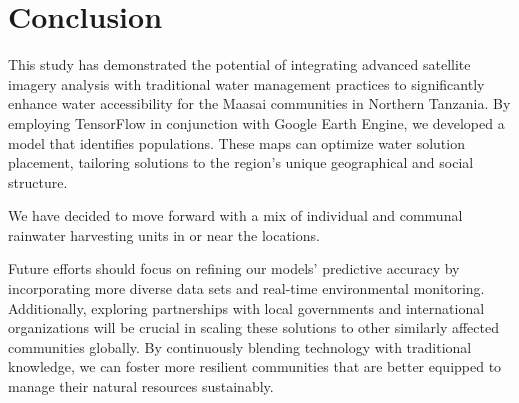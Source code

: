 \documentclass{article}
\begin{document}

\section{Conclusion}

This study has demonstrated the potential of integrating advanced satellite imagery analysis with traditional water management practices to significantly enhance water accessibility for the Maasai communities in Northern Tanzania. By employing TensorFlow in conjunction with Google Earth Engine, we developed a model that identifies populations. These maps can optimize water solution placement, tailoring solutions to the region's unique geographical and social structure.

We have decided to move forward with a mix of individual and communal rainwater harvesting units in or near the locations.

Future efforts should focus on refining our models' predictive accuracy by incorporating more diverse data sets and real-time environmental monitoring. Additionally, exploring partnerships with local governments and international organizations will be crucial in scaling these solutions to other similarly affected communities globally. By continuously blending technology with traditional knowledge, we can foster more resilient communities that are better equipped to manage their natural resources sustainably.



\newpage
\printbibliography
\end{document}
